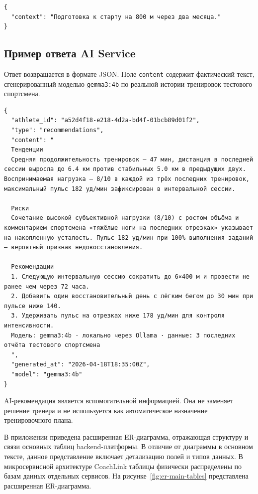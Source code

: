 \begin{lstlisting}
{
  "context": "Подготовка к старту на 800 м через два месяца."
}
\end{lstlisting}

\subsection*{Пример ответа AI Service}

Ответ возвращается в формате JSON. Поле \passthrough{\lstinline!content!} содержит фактический текст, сгенерированный моделью \passthrough{\lstinline!gemma3:4b!} по реальной истории тренировок тестового спортсмена.

\begin{lstlisting}
{
  "athlete_id": "a52d4f18-e218-4d2a-bd4f-01bcb89d01f2",
  "type": "recommendations",
  "content": "
  Тенденции
  Средняя продолжительность тренировок — 47 мин, дистанция в последней сессии выросла до 6.4 км против стабильных 5.0 км в предыдущих двух. Воспринимаемая нагрузка — 8/10 в каждой из трёх последних тренировок, максимальный пульс 182 уд/мин зафиксирован в интервальной сессии.

  Риски
  Сочетание высокой субъективной нагрузки (8/10) с ростом объёма и комментарием спортсмена «тяжёлые ноги на последних отрезках» указывает на накопленную усталость. Пульс 182 уд/мин при 100% выполнения заданий — вероятный признак недовосстановления.

  Рекомендации
  1. Следующую интервальную сессию сократить до 6×400 м и провести не ранее чем через 72 часа.
  2. Добавить один восстановительный день с лёгким бегом до 30 мин при пульсе ниже 140.
  3. Удерживать пульс на отрезках ниже 178 уд/мин для контроля интенсивности.
  Модель: gemma3:4b · локально через Ollama · данные: 3 последних отчёта тестового спортсмена
  ",
  "generated_at": "2026-04-18T18:35:00Z",
  "model": "gemma3:4b"
}
\end{lstlisting}

AI-рекомендация является вспомогательной информацией. Она не заменяет решение тренера и не используется как автоматическое назначение тренировочного плана.


В приложении приведена расширенная ER-диаграмма, отражающая структуру и связи основных таблиц backend-платформы. В отличие от диаграммы в основном тексте, данное представление включает детализацию полей и типов данных. В микросервисной архитектуре CoachLink таблицы физически распределены по базам данных отдельных сервисов. На рисунке~\ref{fig:er-main-tables} представлена расширенная ER-диаграмма.

